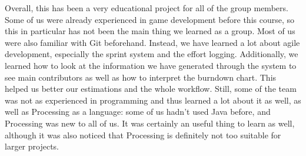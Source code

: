Overall, this has been a very educational project for all of the group members. Some of us were already experienced in game development before this course, so this in particular has not been the main thing we learned as a group. Most of us were also familiar with Git beforehand. Instead, we have learned a lot about agile development, especially the sprint system and the effort logging. Additionally, we learned how to look at the information we have generated through the system to see main contributors as well as how to interpret the burndown chart. This helped us better our estimations and the whole workflow. Still, some of the team was not as experienced in programming and thus learned a lot about it as well, as well as Processing as a language: some of us hadn't used Java before, and Processing was new to all of us. It was certainly an useful thing to learn as well, although it was also noticed that Processing is definitely not too suitable for larger projects.





 



